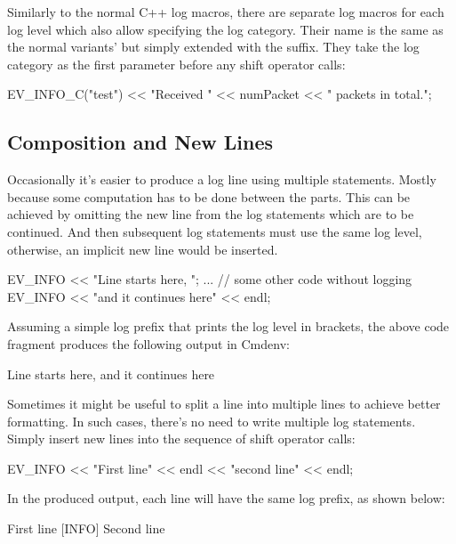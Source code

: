 Similarly to the normal C++ log macros, there are separate log macros for each
log level which also allow specifying the log category. Their name is the same
as the normal variants' but simply extended with the  suffix. They
take the log category as the first parameter before any shift operator calls:

\begin{cpp}
EV_INFO_C("test") << "Received " << numPacket << " packets in total.\n";
\end{cpp}

\subsection{Composition and New Lines}
\label{sec:sim-lib:logging-composition-and-new-lines}

Occasionally it's easier to produce a log line using multiple statements.
Mostly because some computation has to be done between the parts. This can be
achieved by omitting the new line from the log statements which are to be
continued. And then subsequent log statements must use the same log level,
otherwise, an implicit new line would be inserted.

\begin{cpp}
EV_INFO << "Line starts here, ";
... // some other code without logging
EV_INFO << "and it continues here" << endl;
\end{cpp}

Assuming a simple log prefix that prints the log level in brackets, the above
code fragment produces the following output in Cmdenv:

\begin{filelisting}
[INFO] Line starts here, and it continues here
\end{filelisting}

Sometimes it might be useful to split a line into multiple lines to achieve
better formatting. In such cases, there's no need to write multiple log
statements. Simply insert new lines into the sequence of shift operator calls:

\begin{cpp}
EV_INFO << "First line" << endl << "second line" << endl;
\end{cpp}

In the produced output, each line will have the same log prefix, as shown below:

\begin{filelisting}
[INFO] First line
[INFO] Second line
\end{filelisting}

